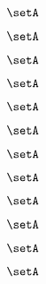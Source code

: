 \begin{forslides}
    \begin{equation}
        \label{eq:slides-translation-127}
        \setA
    \end{equation}

    \begin{equation}
        \label{eq:slides-translation-128}
        \setA
    \end{equation}

    \begin{equation}
        \label{eq:slides-translation-129}
        \setA
    \end{equation}

    \begin{equation}
        \label{eq:slides-translation-130}
        \setA
    \end{equation}

    \begin{equation}
        \label{eq:slides-translation-131}
        \setA
    \end{equation}

    \begin{equation}
        \label{eq:slides-translation-132}
        \setA
    \end{equation}

    \begin{equation}
        \label{eq:slides-translation-133}
        \setA
    \end{equation}

    \begin{equation}
        \label{eq:slides-translation-134}
        \setA
    \end{equation}

    \begin{equation}
        \label{eq:slides-translation-135}
        \setA
    \end{equation}

    \begin{equation}
        \label{eq:slides-translation-136}
        \setA
    \end{equation}

    \begin{equation}
        \label{eq:slides-translation-137}
        \setA
    \end{equation}

    \begin{equation}
        \label{eq:slides-translation-138}
        \setA
    \end{equation}


\end{forslides}
